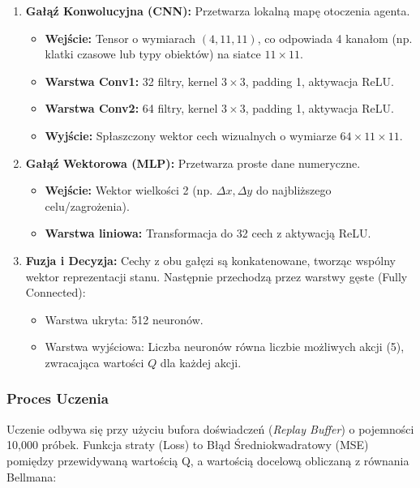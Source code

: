 \documentclass[12pt, a4paper]{article}
\begin{document}
\begin{enumerate}
    \item \textbf{Gałąź Konwolucyjna (CNN):} Przetwarza lokalną mapę otoczenia agenta.
          \begin{itemize}
              \item \textbf{Wejście:} Tensor o wymiarach $(4, 11, 11)$, co odpowiada 4 kanałom (np. klatki czasowe lub typy obiektów) na siatce $11 \times 11$.
              \item \textbf{Warstwa Conv1:} 32 filtry, kernel $3 \times 3$, padding 1, aktywacja ReLU.
              \item \textbf{Warstwa Conv2:} 64 filtry, kernel $3 \times 3$, padding 1, aktywacja ReLU.
              \item \textbf{Wyjście:} Spłaszczony wektor cech wizualnych o wymiarze $64 \times 11 \times 11$.
          \end{itemize}

    \item \textbf{Gałąź Wektorowa (MLP):} Przetwarza proste dane numeryczne.
          \begin{itemize}
              \item \textbf{Wejście:} Wektor wielkości 2 (np. $\Delta x, \Delta y$ do najbliższego celu/zagrożenia).
              \item \textbf{Warstwa liniowa:} Transformacja do 32 cech z aktywacją ReLU.
          \end{itemize}

    \item \textbf{Fuzja i Decyzja:}
          Cechy z obu gałęzi są konkatenowane, tworząc wspólny wektor reprezentacji stanu. Następnie przechodzą przez warstwy gęste (Fully Connected):
          \begin{itemize}
              \item Warstwa ukryta: 512 neuronów.
              \item Warstwa wyjściowa: Liczba neuronów równa liczbie możliwych akcji (5),
                    zwracająca wartości $Q$ dla każdej akcji.
          \end{itemize}
\end{enumerate}

\subsubsection{Proces Uczenia}
Uczenie odbywa się przy użyciu bufora doświadczeń (\textit{Replay Buffer}) o
pojemności 10,000 próbek. Funkcja straty (Loss) to Błąd Średniokwadratowy (MSE)
pomiędzy przewidywaną wartością Q, a wartością docelową obliczaną z równania
Bellmana:
\end{document}
